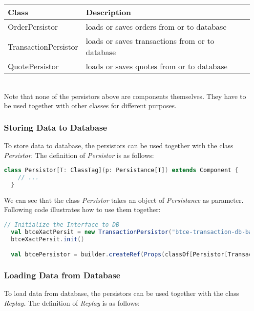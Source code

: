 \noindent
\begin{tabularx}{\textwidth}{|l|X|}
  \hline
  Class & Description  \\
  \hline
  OrderPersistor & loads or saves orders from or to database \\
  \hline
  TransactionPersistor  & loads or saves transactions from or to database  \\
  \hline
  QuotePersistor & loads or saves quotes from or to database  \\
  \hline
\end{tabularx}\\[0.3cm]

Note that none of the persistors above are components themselves. They have to be used together with other classes for different purposes.

\subsubsection{Storing Data to Database}

To store data to database, the persistors can be used together with the class \emph{Persistor}. The definition of \emph{Persistor} is as follows:

\begin{lstlisting}[language=Scala]
  class Persistor[T: ClassTag](p: Persistance[T]) extends Component {
    // ...
  }
\end{lstlisting}

We can see that the class \emph{Persistor} takes an object of \emph{Persistance} as parameter. Following code illustrates how to use them together:

\begin{lstlisting}[language=Scala]
  // Initialize the Interface to DB
  val btceXactPersit = new TransactionPersistor("btce-transaction-db-batch")
  btceXactPersit.init()

  val btcePersistor = builder.createRef(Props(classOf[Persistor[Transaction]], btceXactPersit, implicitly[ClassTag[Transaction]]), "btcePersistor")
\end{lstlisting}

\subsubsection{Loading Data from Database}

To load data from database, the persistors can be used together with the class \emph{Replay}. The definition of \emph{Replay} is as follows:

